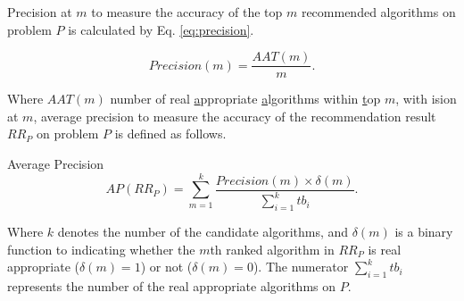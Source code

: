 \documentclass[prodmode,acmtkdd]{acmsmall}
\begin{document}
Precision at $m$ to measure the accuracy of the top $m$ recommended
algorithms on problem $P$ is calculated by Eq. \ref{eq:precision}.

\begin{equation}\label{eq:precision}
        Precision(m) = \frac{AAT(m)}{m}.
\end{equation}

Where $AAT(m)$ number of real \underline{a}ppropriate
\underline{a}lgorithms within \underline{t}op $m$, with ision at
$m$, average precision \cite{baeza1999modern} to measure the
accuracy of the recommendation result $RR_{P}$ on problem $P$ is
defined as follows.

\begin{definition} Average Precision \label{def:averPrecsion}
    \begin{equation}
        AP(RR_{P}) = \sum_{m = 1}^{k}\frac{Precision(m)\times
        \delta(m)}{\sum_{i=1}^{k}tb_i}.
    \end{equation}
\end{definition}

Where $k$ denotes the number of the candidate algorithms, and
$\delta(m)$ is a binary function to indicating whether the $m$th
ranked algorithm in $RR_{P}$ is real appropriate ($\delta(m) = 1$)
or not ($\delta(m) = 0$). The numerator $\sum_{i=1}^{k}tb_i$
represents the number of the real appropriate algorithms on $P$.
\end{document}
